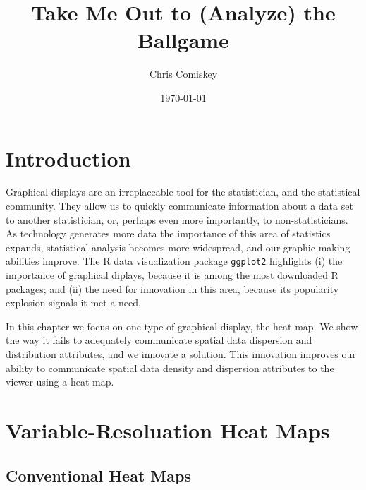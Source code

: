 \documentclass{article}
\title{Take Me Out to (Analyze) the Ballgame}
\author{Chris Comiskey}
\date{\today}
\begin{document}
\maketitle{}

\tableofcontents


\section{Introduction}
Graphical displays are an irreplaceable tool for the statistician, and the statistical community. They allow us to quickly communicate information about a data set to another statistician, or, perhaps even more importantly, to non-statisticians. As technology generates more data the importance of this area of statistics expands, statistical analysis becomes more widespread, and our graphic-making abilities improve. The R data visualization package \verb|ggplot2| highlights (i) the importance of graphical diplays, because it is among the most downloaded R packages; and (ii) the need for innovation in this area, because its popularity explosion signals it met a need.

In this chapter we focus on one type of graphical display, the heat map. We show the way it fails to adequately communicate spatial data dispersion and distribution attributes, and we innovate a solution. This innovation improves our ability to communicate spatial data density and dispersion attributes to the viewer using a heat map.

\section{Variable-Resoluation Heat Maps} %


\subsection{Conventional Heat Maps} %
\end{document}
